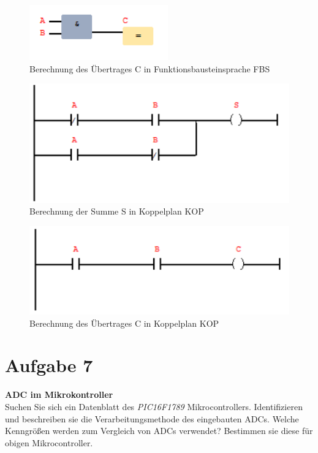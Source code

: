 \documentclass[12pt,a4paper,ngerman]{article}
\begin{document}
\begin{figure}[h!]
\centering
\includegraphics[scale=1]{figures/Aufg6_C_FUP.png} 
\caption{Berechnung des Übertrages C in Funktionsbausteinsprache FBS}
\end{figure}

\begin{figure}[h!]
\centering
\includegraphics[scale=1]{figures/Aufg6_S_KOP.png} 
\caption{Berechnung der Summe S in Koppelplan KOP}
\end{figure}

\begin{figure}[h!]
\centering
\includegraphics[scale=1]{figures/Aufg6_C_KOP.png} 
\caption{Berechnung des Übertrages C in Koppelplan KOP}
\end{figure}

\pagebreak

\section{Aufgabe 7}
\begin{framed}
\textbf{ADC im Mikrokontroller} \\
Suchen Sie sich ein Datenblatt des \textit{PIC16F1789} Mikrocontrollers. Identifizieren und beschreiben sie die Verarbeitungsmethode des eingebauten ADCs. Welche Kenngrößen werden zum Vergleich von ADCs verwendet? Bestimmen sie diese für obigen Mikrocontroller. 
\end{framed}   
   
   
   
\end{document}
